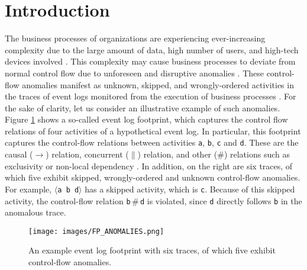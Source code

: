 \section{Introduction}
\label{sec:introduction}
The business processes of organizations are experiencing ever-increasing complexity due to the large amount of data, high number of users, and high-tech devices involved \cite{martin2021pmopportunitieschallenges, beerepoot2023biggestbpmproblems}. This complexity may cause business processes to deviate from normal control flow due to unforeseen and disruptive anomalies \cite{adams2023proceddsriftdetection}. These control-flow anomalies manifest as unknown, skipped, and wrongly-ordered activities in the traces of event logs monitored from the execution of business processes \cite{ko2023adsystematicreview}. For the sake of clarity, let us consider an illustrative example of such anomalies. Figure \ref{FP_ANOMALIES} shows a so-called event log footprint, which captures the control flow relations of four activities of a hypothetical event log. In particular, this footprint captures the control-flow relations between activities \texttt{a}, \texttt{b}, \texttt{c} and \texttt{d}. These are the causal ($\rightarrow$) relation, concurrent ($\parallel$) relation, and other ($\#$) relations such as exclusivity or non-local dependency \cite{aalst2022pmhandbook}. In addition, on the right are six traces, of which five exhibit skipped, wrongly-ordered and unknown control-flow anomalies. For example, $\langle$\texttt{a b d}$\rangle$ has a skipped activity, which is \texttt{c}. Because of this skipped activity, the control-flow relation \texttt{b}$\,\#\,$\texttt{d} is violated, since \texttt{d} directly follows \texttt{b} in the anomalous trace.
\begin{figure}[!t]
\centering
\texttt{[image: images/FP\_ANOMALIES.png]}
\caption{An example event log footprint with six traces, of which five exhibit control-flow anomalies.}
\label{FP_ANOMALIES}
\end{figure}


